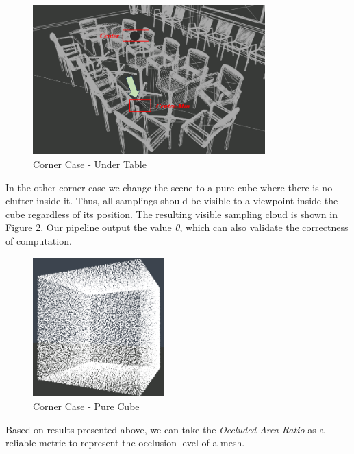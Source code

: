 \documentclass[11pt, a4paper,oneside,chapterprefix=false]{scrbook}
\begin{document}
\begin{figure}[H]
    \centering
    \includegraphics*[width=0.8\textwidth]{figures/edge case-under table.png}
    \caption{Corner Case - Under Table}
    \label{fig:corner case under table}
\end{figure}

In the other corner case we change the scene to a pure cube where there is no clutter inside it. Thus, all samplings should be visible to a viewpoint inside the cube regardless of its position. The resulting visible sampling cloud is shown in Figure \ref{fig:corner case pure cube}. Our pipeline output the value \emph{0}, which can also validate the correctness of computation. 

\vspace{10pt}

\begin{figure}[H]
    \centering
    \includegraphics*[width=0.45\textwidth]{figures/cube with all samples.png}
    \caption{Corner Case - Pure Cube}
    \label{fig:corner case pure cube}
\end{figure}

Based on results presented above, we can take the \emph{Occluded Area Ratio} as a reliable metric to represent the occlusion level of a mesh.
\end{document}
